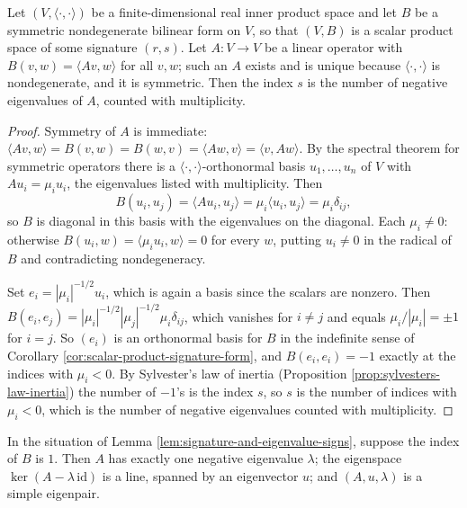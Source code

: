\begin{lemma}
\label{lem:signature-and-eigenvalue-signs}
\leanok
{}
Let $(V,\langle\cdot,\cdot\rangle)$ be a finite-dimensional real inner product space and let $B$ be a symmetric nondegenerate bilinear form on $V$, so that $(V,B)$ is a scalar product space of some signature $(r,s)$. Let $A : V \to V$ be a linear operator with $B(v,w) = \langle Av, w\rangle$ for all $v,w$; such an $A$ exists and is unique because $\langle\cdot,\cdot\rangle$ is nondegenerate, and it is symmetric. Then the index $s$ is the number of negative eigenvalues of $A$, counted with multiplicity.
\end{lemma}

\begin{proof}
\leanok
{}
Symmetry of $A$ is immediate: $\langle Av,w\rangle = B(v,w) = B(w,v) = \langle Aw,v\rangle = \langle v, Aw\rangle$. By the spectral theorem for symmetric operators there is a $\langle\cdot,\cdot\rangle$-orthonormal basis $u_1,\dots,u_n$ of $V$ with $Au_i = \mu_i u_i$, the eigenvalues listed with multiplicity. Then
\[
  B(u_i,u_j) = \langle Au_i, u_j\rangle = \mu_i\langle u_i,u_j\rangle = \mu_i\delta_{ij},
\]
so $B$ is diagonal in this basis with the eigenvalues on the diagonal. Each $\mu_i \neq 0$: otherwise $B(u_i, w) = \langle \mu_i u_i, w\rangle = 0$ for every $w$, putting $u_i \neq 0$ in the radical of $B$ and contradicting nondegeneracy.

Set $e_i = |\mu_i|^{-1/2}u_i$, which is again a basis since the scalars are nonzero. Then $B(e_i,e_j) = |\mu_i|^{-1/2}|\mu_j|^{-1/2}\mu_i\delta_{ij}$, which vanishes for $i \neq j$ and equals $\mu_i/|\mu_i| = \pm 1$ for $i = j$. So $(e_i)$ is an orthonormal basis for $B$ in the indefinite sense of Corollary \ref{cor:scalar-product-signature-form}, and $B(e_i,e_i) = -1$ exactly at the indices with $\mu_i < 0$. By Sylvester's law of inertia (Proposition \ref{prop:sylvesters-law-inertia}) the number of $-1$'s is the index $s$, so $s$ is the number of indices with $\mu_i < 0$, which is the number of negative eigenvalues counted with multiplicity.
\end{proof}

\begin{lemma}
\label{lem:simple-eigenpair-of-index-one}
\leanok
{}
In the situation of Lemma \ref{lem:signature-and-eigenvalue-signs}, suppose the index of $B$ is $1$. Then $A$ has exactly one negative eigenvalue $\lambda$; the eigenspace $\ker(A - \lambda\,\mathrm{id})$ is a line, spanned by an eigenvector $u$; and $(A, u, \lambda)$ is a simple eigenpair.
\end{lemma}

